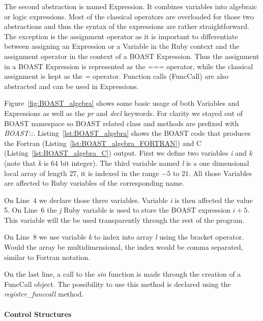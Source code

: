 \documentclass{IEEEtran}
\begin{document}
The second abstraction is named Expression. It combines variables into
algebraic or logic expressions. Most of the classical operators are overloaded
for those two abstractions and thus the syntax of the expressions are rather
straightforward. The exception is the assignment operator as it is important to
differentiate between assigning an Expression or a Variable in the Ruby context
and the assignment operator in the context of a BOAST Expression. Thus the
assignment in a BOAST Expression is represented as the \emph{===} operator,
while the classical assignment is kept as the \emph{=} operator. Function calls
(FuncCall) are also abstracted and can be used in Expressions.

Figure~\ref{fig:BOAST_algebra} shows some basic usage of both Variables and
Expressions as well as the \emph{pr} and \emph{decl} keywords. For clarity we
stayed out of BOAST namespace so BOAST related class and methods are prefixed
with \emph{BOAST::}. Listing~\ref{lst:BOAST_algebra} shows the BOAST code that
produces the Fortran (Listing~\ref{lst:BOAST_algebra_FORTRAN}) and C
(Listing~\ref{lst:BOAST_algebra_C}) output. First we define two variables
\emph{i} and \emph{k} (note that \emph{k} is $64$ bit integer). The third
variable named \emph{l} is a one dimensional local array of length $27$, it
is indexed in the range $-5$ to $21$. All those Variables are affected to Ruby
variables of the corresponding name.

On Line~4 we declare those three variables. Variable \emph{i} is then affected
the value 5. On Line~6 the \emph{j} Ruby variable is used to store the BOAST
expression \emph{$i+5$}. This variable will the be used transparently through
the rest of the program.

On Line~8 we use variable \emph{k} to index into array \emph{l} using the
bracket operator. Would the array be multidimensional, the index would be comma
separated, similar to Fortran notation.

On the last line, a call to the \emph{sin} function is made through the creation
of a FuncCall object.  The possibility to use this method is declared using the
\emph{register\_funccall} method.

      \paragraph{Control Structures}
\end{document}
